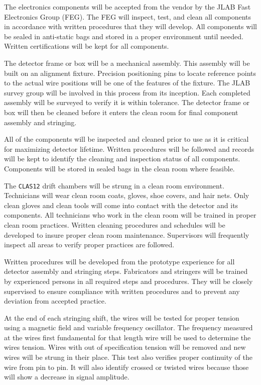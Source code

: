 The electronics components will be accepted from the vendor by the JLAB Fast 
Electronics Group (FEG).  The FEG will inspect, test, and clean all 
components in accordance with written procedures that they will develop.  
All components will be sealed in anti-static bags and stored in a proper 
environment until needed.  Written certifications will be kept for all 
components.

The detector frame or box will be a mechanical assembly. This assembly will 
be built on an alignment fixture.  Precision positioning pins to locate 
reference points to the actual wire positions will be one of the features of 
the fixture. The JLAB survey group will be involved in this process from its 
inception.  Each completed assembly will be surveyed to verify it is within 
tolerance. The detector frame or box will then be cleaned before it enters the 
clean room for final component assembly and stringing.

All of the components will be inspected and cleaned prior to use as it is 
critical for maximizing detector lifetime.  Written procedures will be 
followed and records will be kept to identify the cleaning and inspection 
status of all components. Components will be stored in sealed bags in the 
clean room where feasible.

The {\tt CLAS12} drift chambers will be strung in a clean room environment. 
Technicians will wear clean room coats, gloves, shoe covers, and hair nets. 
Only clean gloves and clean tools will come into contact with the detector 
and its components.  All technicians who work in the clean room will be 
trained in proper clean room practices.  Written cleaning procedures and 
schedules will be developed to insure proper clean room maintenance. 
Supervisors will frequently inspect all areas to verify proper practices are 
followed.

Written procedures will be developed from the prototype experience for all 
detector assembly and stringing steps.  Fabricators and stringers will be 
trained by experienced persons in all required steps and procedures. They 
will be closely supervised to ensure compliance with written procedures and 
to prevent any deviation from accepted practice. 

At the end of each stringing shift, the wires will be tested for proper 
tension using a magnetic field and variable frequency oscillator. The 
frequency measured at the wires first fundamental for that length wire will 
be used to determine the wires tension. Wires with out of specification 
tension will be removed and new wires will be strung in their place. This test 
also verifies proper continuity of the wire from pin to pin. It will also 
identify crossed or twisted wires because those will show a decrease in 
signal amplitude.

